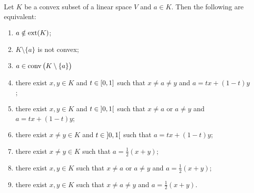 \begin{lemma} \label{notExtremePointLemma}
Let $K$ be a convex subset of a linear space $V$ and $a\in K$. Then the following are equivalent:
\begin{enumerate}
\item $a\notin \operatorname{ext}(K)$;
\item $K\setminus \{a\}$ is not convex;
\item $a\in \operatorname{conv}\big(K\setminus \{a\}\big)$
\item there exist $x,y\in K$ and $t\in \interval{0,1}$ such that $x\neq a\neq y$ and $a = tx+ (1-t)y$;
\item there exist $x,y\in K$ and $t\in \interval[o]{0,1}$ such that $x\neq a$ or $a\neq y$ and $a = tx+ (1-t)y$;
\item there exist $x\neq y\in K$ and $t\in \interval[o]{0,1}$ such that $a = tx+ (1-t)y$;
\item there exist $x\neq y\in K$ such that $a = \frac{1}{2}(x+ y)$;
\item there exist $x,y\in K$ such that $x\neq a$ or $a\neq y$ and $a = \frac{1}{2}(x+ y)$;
\item there exist $x,y\in K$ such that $x\neq a\neq y$ and $a = \frac{1}{2}(x+ y)$.
\end{enumerate}
\end{lemma}

